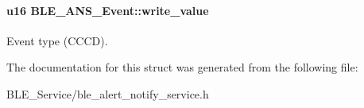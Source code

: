 \paragraph[{\texorpdfstring{write\+\_\+value}{write_value}}]{\setlength{\rightskip}{0pt plus 5cm}u16 B\+L\+E\+\_\+\+A\+N\+S\+\_\+\+Event\+::write\+\_\+value}\hypertarget{struct_b_l_e___a_n_s___event_ac1f09880b6581a1a0458acdbaadaf39b}{}\label{struct_b_l_e___a_n_s___event_ac1f09880b6581a1a0458acdbaadaf39b}
Event type (C\+C\+CD). 

The documentation for this struct was generated from the following file\+:\begin{DoxyCompactItemize}
\item 
B\+L\+E\+\_\+\+Service/ble\+\_\+alert\+\_\+notify\+\_\+service.\+h\end{DoxyCompactItemize}
